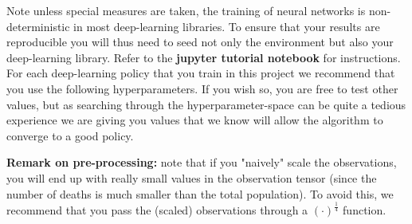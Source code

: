 \documentclass[10pt]{article}
\begin{document}
Note unless special measures are taken, the training of neural networks is non-deterministic in most deep-learning libraries.
To ensure that your results are reproducible you will thus need to seed not only the environment but also your deep-learning library.
Refer to the \textbf{jupyter tutorial notebook} for instructions.\\


For each deep-learning policy that you train in this project we recommend that you use the following hyperparameters.
If you wish so, you are free to test other values, but as searching through the hyperparameter-space can be quite a tedious experience we are giving you values that we know will allow the algorithm to converge to a good policy.

\noindent
\textbf{Remark on pre-processing: }note that if you "naively" scale the observations, you will end up with really small values in the observation tensor (since the number of deaths is much smaller than the total population).
To avoid this, we recommend that you pass the (scaled) observations through a $(\cdot)^{\frac{1}{4}}$ function.

\begin{table}[ht]
\begin{center}
  \end{center}
  \caption{Suggested training hyperparameters.}
  \label{table:hyperparameters}
\end{table}
\end{document}
